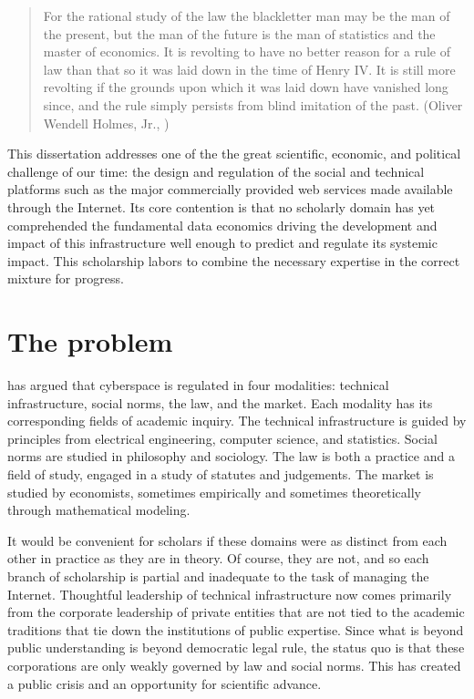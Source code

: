 \documentclass[../thesis.tex]{subfiles}
\begin{document}
 \begin{quote}
 For the rational study of the law the blackletter man may be the man of the present, but the man of the future is the man of statistics and the master of economics. It is revolting to have no better reason for a rule of law than that so it was laid down in the time of Henry IV. It is still more revolting if the grounds upon which it was laid down have vanished long since, and the rule simply persists from blind imitation of the past. (Oliver Wendell Holmes, Jr., \cite{holmes1897path})
 \end{quote}
 
 This dissertation addresses one of the the great
 scientific, economic,
 and political challenge of our time: the design and
 regulation of
 the social and technical platforms such as the major
 commercially
 provided web services made available through the Internet.
 Its core contention is that no scholarly domain has yet
 comprehended the
 fundamental data economics driving the development and
 impact of this
 infrastructure well enough to predict and regulate its
 systemic impact.
 This scholarship labors to combine the necessary expertise
 in the
 correct mixture for progress.

\section{The problem}
 
 \citet{lessig2009code} has argued that cyberspace is regulated
 in four modalities: technical infrastructure, social norms,
 the law, and the market.
 Each modality has its corresponding fields of academic inquiry.
 The technical infrastructure is guided by principles from
 electrical engineering, computer science, and statistics.
 Social norms are studied in philosophy and sociology.
 The law is both a practice and a field of study,
 engaged in a study of statutes and judgements.
 The market is studied by economists, sometimes empirically
 and sometimes theoretically through mathematical modeling.

 It would be convenient for scholars if these domains were
 as distinct from each other in practice as they are in
 theory.
 Of course, they are not, and so each branch of scholarship
 is partial and inadequate to the task of managing the Internet.
 Thoughtful leadership of technical infrastructure now comes
 primarily from the corporate leadership of private entities
 that are not tied to the academic traditions that tie down
 the institutions of public expertise.
 Since what is beyond public understanding is beyond democratic
 legal rule, the status quo is that these corporations are only
 weakly governed by law and social norms.
 This has created a public crisis and an opportunity for
 scientific advance.
 
\end{document}
